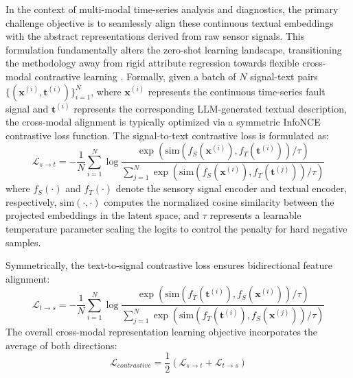 In the context of multi-modal time-series analysis and diagnostics, the primary challenge objective is to seamlessly align these continuous textual embeddings with the abstract representations derived from raw sensor signals. This formulation fundamentally alters the zero-shot learning landscape, transitioning the methodology away from rigid attribute regression towards flexible cross-modal contrastive learning \cite{chen2020simple} \cite{oord2018representation,chen2020simple}. Formally, given a batch of $N$ signal-text pairs $\{(\mathbf{x}^{(i)}, \mathbf{t}^{(i)})\}_{i=1}^N$, where $\mathbf{x}^{(i)}$ represents the continuous time-series fault signal and $\mathbf{t}^{(i)}$ represents the corresponding LLM-generated textual description, the cross-modal alignment is typically optimized via a symmetric InfoNCE contrastive loss function. The signal-to-text contrastive loss is formulated as:
\begin{equation}
\label{eq:contrastive_s2t}
\mathcal{L}_{s \rightarrow t} = - \frac{1}{N} \sum_{i=1}^{N} \log \frac{\exp\left(\text{sim}(f_S(\mathbf{x}^{(i)}), f_T(\mathbf{t}^{(i)})) / \tau\right)}{\sum_{j=1}^{N} \exp\left(\text{sim}(f_S(\mathbf{x}^{(i)}), f_T(\mathbf{t}^{(j)})) / \tau\right)}
\end{equation}
where $f_S(\cdot)$ and $f_T(\cdot)$ denote the sensory signal encoder and textual encoder, respectively, $\text{sim}(\cdot, \cdot)$ computes the normalized cosine similarity between the projected embeddings in the latent space, and $\tau$ represents a learnable temperature parameter scaling the logits to control the penalty for hard negative samples.

Symmetrically, the text-to-signal contrastive loss ensures bidirectional feature alignment:
\begin{equation}
\label{eq:contrastive_t2s}
\mathcal{L}_{t \rightarrow s} = - \frac{1}{N} \sum_{i=1}^{N} \log \frac{\exp\left(\text{sim}(f_T(\mathbf{t}^{(i)}), f_S(\mathbf{x}^{(i)})) / \tau\right)}{\sum_{j=1}^{N} \exp\left(\text{sim}(f_T(\mathbf{t}^{(i)}), f_S(\mathbf{x}^{(j)})) / \tau\right)}
\end{equation}
The overall cross-modal representation learning objective incorporates the average of both directions:
\begin{equation}
\label{eq:contrastive_total}
\mathcal{L}_{contrastive} = \frac{1}{2} (\mathcal{L}_{s \rightarrow t} + \mathcal{L}_{t \rightarrow s})
\end{equation}

